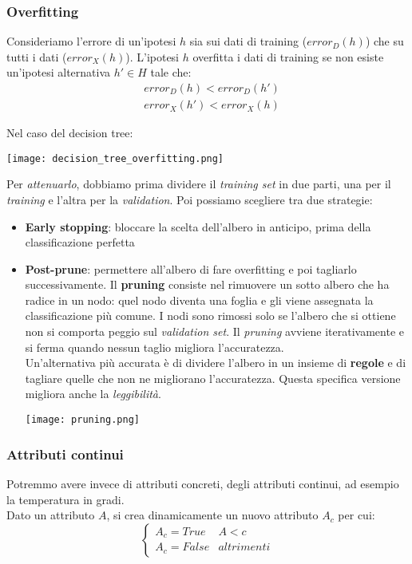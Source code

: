 \subsubsection{Overfitting}
\begin{definition}[Overfitting]
	Consideriamo l'errore di un'ipotesi $h$ sia sui dati di training ($error_D(h)$) che su tutti i dati ($error_X(h)$). L'ipotesi $h$ overfitta i dati di training se non esiste un'ipotesi alternativa $h' \in H$ tale che:
	\begin{align*}
		& error_D(h) < error_D(h') \\
		& error_X(h')<error_X(h)
	\end{align*}
\end{definition}
\noindent Nel caso del decision tree:
\begin{center}
	\texttt{[image: decision\_tree\_overfitting.png]}
\end{center}
Per \textit{attenuarlo}, dobbiamo prima dividere il \textit{training set} in due parti, una per il \textit{training} e l'altra per la \textit{validation}. Poi possiamo scegliere tra due strategie:
\begin{itemize}
	\item \textbf{Early stopping}: bloccare la scelta dell'albero in anticipo, prima della classificazione perfetta
	\item \textbf{Post-prune}: permettere all'albero di fare overfitting e poi tagliarlo successivamente. Il \textbf{pruning} consiste nel rimuovere un sotto albero che ha radice in un nodo: quel nodo diventa una foglia e gli viene assegnata la classificazione più comune. I nodi sono rimossi solo se l'albero che si ottiene non si comporta peggio sul \textit{validation set}. Il \textit{pruning} avviene iterativamente e si ferma quando nessun taglio migliora l'accuratezza.\\
	Un'alternativa più accurata è di dividere l'albero in un insieme di \textbf{regole} e di tagliare quelle che non ne migliorano l'accuratezza. Questa specifica versione migliora anche la \textit{leggibilità}.
	\begin{center}
		\texttt{[image: pruning.png]}
	\end{center}
\end{itemize}
\subsubsection{Attributi continui}
Potremmo avere invece di attributi concreti, degli attributi continui, ad esempio la temperatura in gradi.\\
Dato un attributo $A$, si crea dinamicamente un nuovo attributo $A_c$ per cui:
\begin{equation*}
	\begin{cases}
		A_c=True & A<c \\
		A_c=False & altrimenti
	\end{cases}
\end{equation*}

